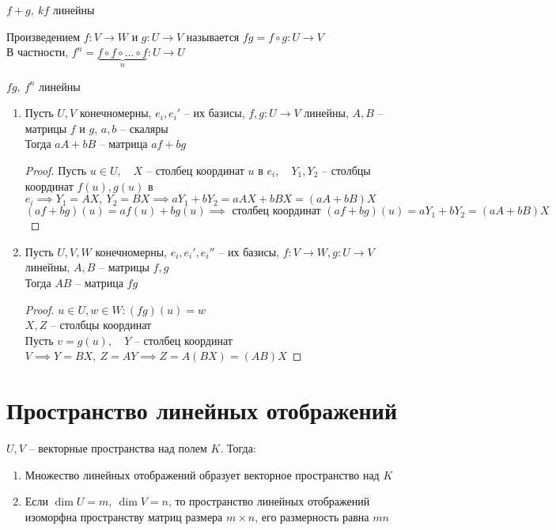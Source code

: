 \begin{remark}
	$ f + g, ~ kf $ линейны
\end{remark}

\begin{definition}
	Произведением $ f : V \to W $ и $ g : U \to V $ называется $ fg = f \circ g : U \to V $ \\
    В частности, $ f^n = \underbrace{f \circ f \circ ... \circ f}_n : U \to U $
\end{definition}

\begin{remark}
	$ fg, ~ f^n $ линейны
\end{remark}

\begin{lemma}
	\hfill
    \begin{enumerate}
    	\item Пусть $ U, V $ конечномерны, $ e_i, e_i' $ -- их базисы, $f, g : U \to V $ линейны, $ A, B $ -- матрицы $ f $ и $ g $, $ a, b $ -- скаляры \\
        Тогда $ aA + bB $ -- матрица $ af + bg $
        \begin{proof}
        	Пусть $ u \in U, \quad X $ -- столбец координат $ u $ в $ e_i, \quad Y_1, Y_2 $ -- столбцы координат $ f(u), g(u) $ в $ e_i \implies Y_1 = AX, ~ Y_2 = BX \implies aY_1 + bY_2 = aAX + bBX = (aA + bB)X $
            $$ (af + bg)(u) = af(u) + bg(u) \implies \text{ столбец координат } (af + bg)(u) = aY_1 + bY_2 = (aA + bB)X $$
        \end{proof}
        \item Пусть $ U, V, W $ конечномерны, $ e_i, e_i', e_i'' $ -- их базисы, $ f : V \to W, g : U \to V $ линейны, $ A, B $ -- матрицы $ f, g $ \\
        Тогда $ AB $ -- матрица $ fg $
        \begin{proof}
        	$ u \in U, w \in W : (fg)(u) = w $ \\
            $ X, Z $ -- столбцы координат \\
            Пусть $ v = g(u), \quad Y $ -- столбец координат $ V \implies Y = BX, ~ Z = AY \implies Z = A(BX) = (AB)X $
        \end{proof}
    \end{enumerate}
\end{lemma}

\section{Пространство линейных отображений}

\begin{theorem}
	$ U, V $ -- векторные пространства над полем $ K $. Тогда:
    \begin{enumerate}
    	\item Множество линейных отображений образует векторное пространство над $ K $
        \item Если $ \dim U = m, ~ \dim V = n $, то пространство линейных отображений изоморфна пространству матриц размера $ m \times n $, его размерность равна $ mn $
    \end{enumerate}
\end{theorem}
